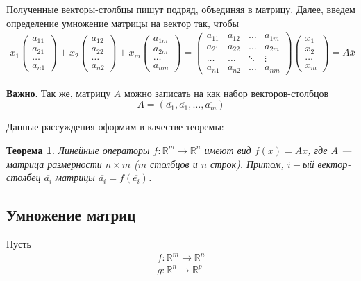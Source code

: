 \documentclass[]{article}
\newtheorem{theorem}{Теорема}
\begin{document}
	 Полученные векторы-столбцы пишут подряд, объединяя в матрицу. Далее, введем определение умножение матрицы на вектор так, чтобы 
	\begin{gather*}
		x_1
	\begin{pmatrix}
		a_{11}
		\\
		a_{21}
		\\
		\ldots
		\\
		a_{n1}
	\end{pmatrix}
	+
	x_2
	\begin{pmatrix}
		a_{12}
		\\
		a_{22}
		\\
		\ldots
		\\
		a_{n2}
	\end{pmatrix}
	+
	x_m
	\begin{pmatrix}
		a_{1m}
		\\
		a_{2m}
		\\
		\ldots
		\\
		a_{nm}
	\end{pmatrix}
	=
	\begin{pmatrix}
		a_{11} & a_{12} & \ldots & a_{1m}
		\\
		a_{21} & a_{22} & \ldots & a_{2m}
		\\
		\ldots & \ldots & \ddots & \vdots
		\\
		a_{n1} & a_{n2} & \ldots & a_{nm}
	\end{pmatrix}
	\begin{pmatrix}
		x_{1}
		\\
		x_{2}
		\\
		\ldots
		\\
		x_{m}
	\end{pmatrix}
	=A\overline{x}
\end{gather*}

\textbf{Важно}. Так же, матрицу $A$ можно записать на как набор векторов-столбцов
\begin{equation*}
	A=(\overline{a_1},\overline{a_1},\ldots,\overline{a_m})
\end{equation*}

Данные рассуждения оформим в качестве теоремы:
\begin{theorem}\label{th1}
	Линейные операторы $f:\mathbb{R}^m\rightarrow\mathbb{R}^n$ имеют вид $f(x)=Ax$, где $A$ --- матрица размерности $n\times m$ ($m$ столбцов и $n$ строк). Притом, $i-$ый вектор-столбец $\overline{a_i}$ матрицы $\overline{a_i}=f(\overline{e_i})$.
\end{theorem}

\subsection{Умножение матриц}
Пусть \begin{gather*}
	f:\mathbb{R}^m\rightarrow\mathbb{R}^n
	\\
	g:\mathbb{R}^n\rightarrow\mathbb{R}^p
\end{gather*}
\end{document}
